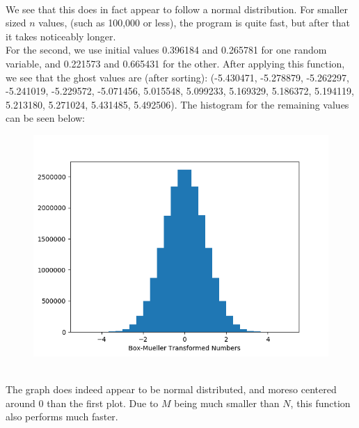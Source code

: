 \documentclass[12pt]{article}
\begin{document}
\\We see that this does in fact appear to follow a normal distribution. For smaller sized $n$ values, (such as 100,000 or less), the program is quite fast, but after that it takes noticeably longer.
\\For the second, we use initial values 0.396184 and 0.265781 for one random variable, and 0.221573 and 0.665431 for the other. After applying this function, we see that the ghost values are (after sorting): (-5.430471, -5.278879, -5.262297, -5.241019, -5.229572, -5.071456, 5.015548, 5.099233, 5.169329, 5.186372, 5.194119, 5.213180, 5.271024, 5.431485, 5.492506). The histogram for the remaining values can be seen below:
\begin{figure}[h]
	\begin{center}
		\includegraphics*[scale=.75]{boxplot2.png}
	\end{center}
\end{figure}
\\The graph does indeed appear to be normal distributed, and moreso centered around 0 than the first plot. Due to $M$ being much smaller than $N$, this function also performs much faster. 
\newpage
\end{document}
